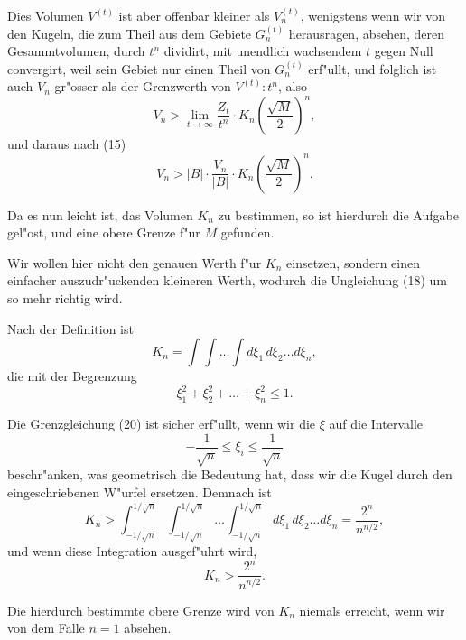 \documentclass[12pt,a4paper]{article}
\theoremstyle{definition}
\begin{document}
Dies Volumen $V^{(t)}$ ist aber offenbar kleiner als $V_n^{(t)}$, wenigstens wenn wir von den Kugeln, die zum Theil aus dem Gebiete $G_n^{(t)}$ herausragen, absehen, deren Gesammtvolumen, durch $t^n$ dividirt, mit unendlich wachsendem $t$ gegen Null convergirt, weil sein Gebiet nur einen Theil von $G_n^{(t)}$ erf"ullt, und folglich ist auch $V_n$ gr"osser als der Grenzwerth von $V^{(t)} : t^n$, also
\begin{equation}
V_n > \lim_{t \to \infty} \frac{Z_t}{t^n} \cdot K_n \left(\frac{\sqrt{M}}{2}\right)^n,
\end{equation}
und daraus nach (15)
\begin{equation}
V_n > |B| \cdot \frac{V_n}{|B|} \cdot K_n \left(\frac{\sqrt{M}}{2}\right)^n.
\end{equation}

Da es nun leicht ist, das Volumen $K_n$ zu bestimmen, so ist hierdurch die Aufgabe gel"ost, und eine obere Grenze f"ur $M$ gefunden.

Wir wollen hier nicht den genauen Werth f"ur $K_n$ einsetzen, sondern einen einfacher auszudr"uckenden kleineren Werth, wodurch die Ungleichung (18) um so mehr richtig wird.

Nach der Definition ist
\begin{equation}
K_n = \int\!\!\int\!\dots\!\int d\xi_1 \, d\xi_2 \dots d\xi_n,
\end{equation}
die mit der Begrenzung
\begin{equation}
\xi_1^2 + \xi_2^2 + \dots + \xi_n^2 \leq 1.
\end{equation}

Die Grenzgleichung (20) ist sicher erf"ullt, wenn wir die $\xi$ auf die Intervalle
\begin{equation}
-\frac{1}{\sqrt{n}} \leq \xi_i \leq \frac{1}{\sqrt{n}}
\end{equation}
beschr"anken, was geometrisch die Bedeutung hat, dass wir die Kugel durch den eingeschriebenen W"urfel ersetzen. Demnach ist
\begin{equation}
K_n > \int_{-1/\sqrt{n}}^{1/\sqrt{n}} \!\! \int_{-1/\sqrt{n}}^{1/\sqrt{n}} \!\dots \int_{-1/\sqrt{n}}^{1/\sqrt{n}} d\xi_1 \, d\xi_2 \dots d\xi_n = \frac{2^n}{n^{n/2}},
\end{equation}
und wenn diese Integration ausgef"uhrt wird,
\begin{equation}
K_n > \frac{2^n}{n^{n/2}}.
\end{equation}

Die hierdurch bestimmte obere Grenze wird von $K_n$ niemals erreicht, wenn wir von dem Falle $n = 1$ absehen.
\end{document}
